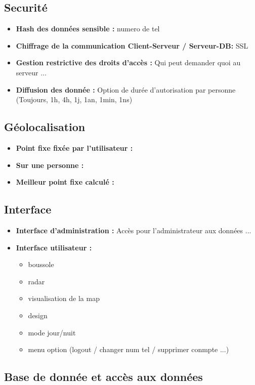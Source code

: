 \documentclass[french]{article}
\begin{document}
		\subsection{Securité}
			\begin{itemize}
				\item \textbf{Hash des données sensible : } numero de tel
				\item \textbf{Chiffrage de la communication Client-Serveur / Serveur-DB: } SSL
				\item \textbf{ Gestion restrictive des droits d'accès : } Qui peut demander quoi au serveur ...
				\item \textbf{Diffusion des donnée : } Option de durée d'autorisation par personne (Toujours, 1h, 4h, 1j, 1an, 1min, 1ns)
			\end{itemize}
		\subsection{Géolocalisation}
			\begin{itemize}
				\item \textbf{Point fixe fixée par l'utilisateur : }
				\item \textbf{Sur une personne : }
				\item \textbf{Meilleur point fixe calculé : }
			\end{itemize}
			
		
		\subsection{Interface}
			\begin{itemize}
				\item \textbf{Interface d'administration : } Accès pour l'administrateur aux données ...
				\item \textbf{Interface utilisateur : }
				\begin{itemize}
					\item boussole
					\item radar
					\item visualisation de la map
					\item design 
					\item mode jour/nuit 
					\item menu option (logout / changer num tel / supprimer conmpte ...)
				\end{itemize} 
			\end{itemize}
		
		\subsection{Base de donnée et accès aux données}
		
\end{document}
